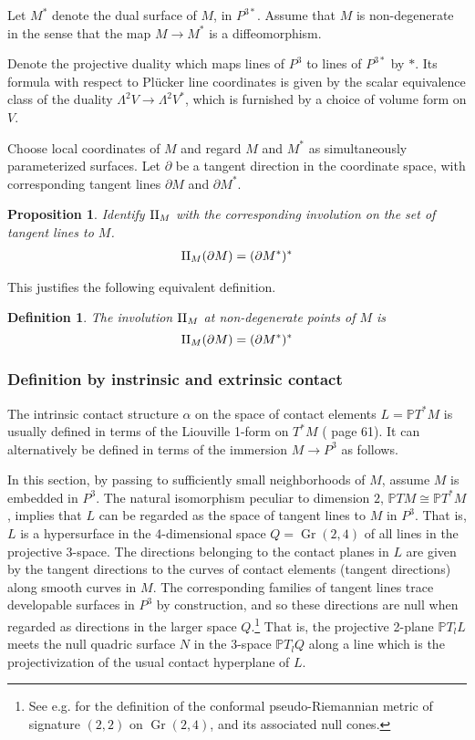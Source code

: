 \documentclass[11pt]{article}
\numberwithin{equation}{section}
\newcounter{count}
\theoremstyle{plain}
\newtheorem{definition}[count]{Definition}
\newtheorem{proposition}[count]{Proposition}
\theoremstyle{remark}
\renewcommand{\P}{\mathbb{P}}
\renewcommand{\L}{\Lambda}
\newcommand{\D}{\partial}
\newcommand{\II}{\textnormal{II}}
\begin{document}
Let $M^{*}$ denote the dual surface of $M$, in $P^{3*}$. Assume that $M$ is non-degenerate in the sense that the map $M\rightarrow  M^{*}$ is a diffeomorphism.

Denote the projective duality which maps lines of $P^{3}$ to lines of $P^{3*}$ by $*$. Its formula with respect to Pl\"ucker line coordinates is given by the scalar equivalence class of the duality $\L^{2}V\rightarrow  \L^{2}V^{*}$, which is furnished by a choice of volume form on $V$.

Choose local coordinates of $M$ and regard $M$ and $M^*$ as simultaneously parameterized surfaces. Let $\D$ be a tangent direction in the coordinate space, with corresponding tangent lines $\D M$ and $\D M^*$.

\begin{proposition} Identify $\II_M$ with the corresponding involution on the set of tangent lines to $M$.
\begin{align}
\II_{M}(\D M)= (\D M^*)^*
\end{align}
\end{proposition}

This justifies the following equivalent definition.

\begin{definition} The involution $\II_M$ at non-degenerate points of $M$ is
\[\II_{M}(\D M)= (\D M^*)^*\]
\end{definition}

\subsubsection{Definition by instrinsic and extrinsic contact}

The intrinsic contact structure $\alpha$ on the space of contact elements $L=\P T^{*}M$ is usually defined in terms of the Liouville 1-form on $T^*M$ (\cite{anacan} page 61). It can alternatively be defined in terms of the immersion $M\rightarrow P^{3}$ as follows.

In this section, by passing to sufficiently small neighborhoods of $M$, assume $M$ is embedded in $P^{3}$. The natural isomorphism peculiar to dimension $2$, $\P TM\cong \P T^{*}M$, implies that $L$ can be regarded as the space of tangent lines to $M$ in $P^{3}$. That is, $L$ is a hypersurface in the 4-dimensional space $Q=\operatorname{Gr}(2,4)$ of all lines in the projective 3-space.  The directions belonging to the contact planes in $L$ are given by the tangent directions to the curves of contact elements (tangent directions) along smooth curves in $M$. The corresponding families of tangent lines trace developable surfaces in $P^{3}$ by construction, and so these directions are null when regarded as directions in the larger space $Q$.\footnote{See e.g. \cite{ww} for the definition of the conformal pseudo-Riemannian metric of signature $(2,2)$ on $\operatorname{Gr}(2,4)$, and its associated null cones.} That is, the projective 2-plane $\P T_l L$ meets the null quadric surface $N$ in the 3-space $\P T_l Q$ along a line which is the projectivization of the usual contact hyperplane of $L$.
\end{document}
